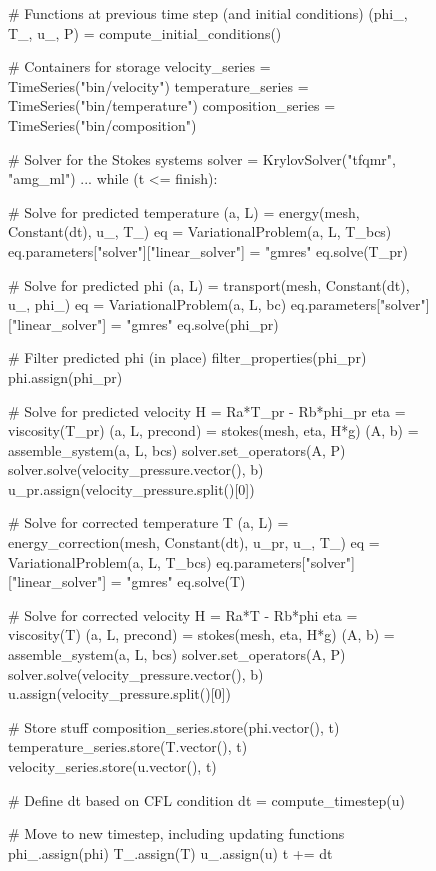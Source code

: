 \begin{figure}
  \begin{center}
    \begin{python}
# Functions at previous time step (and initial conditions)
(phi_, T_, u_, P) = compute_initial_conditions()

# Containers for storage
velocity_series = TimeSeries("bin/velocity")
temperature_series = TimeSeries("bin/temperature")
composition_series = TimeSeries("bin/composition")

# Solver for the Stokes systems
solver = KrylovSolver("tfqmr", "amg_ml")
...
while (t <= finish):

    # Solve for predicted temperature
    (a, L) = energy(mesh, Constant(dt), u_, T_)
    eq = VariationalProblem(a, L, T_bcs)
    eq.parameters["solver"]["linear_solver"] = "gmres"
    eq.solve(T_pr)

    # Solve for predicted phi
    (a, L) = transport(mesh, Constant(dt), u_, phi_)
    eq = VariationalProblem(a, L, bc)
    eq.parameters["solver"]["linear_solver"] = "gmres"
    eq.solve(phi_pr)

    # Filter predicted phi (in place)
    filter_properties(phi_pr)
    phi.assign(phi_pr)

    # Solve for predicted velocity
    H = Ra*T_pr - Rb*phi_pr
    eta = viscosity(T_pr)
    (a, L, precond) = stokes(mesh, eta, H*g)
    (A, b) = assemble_system(a, L, bcs)
    solver.set_operators(A, P)
    solver.solve(velocity_pressure.vector(), b)
    u_pr.assign(velocity_pressure.split()[0])

    # Solve for corrected temperature T
    (a, L) = energy_correction(mesh, Constant(dt), u_pr, u_, T_)
    eq = VariationalProblem(a, L, T_bcs)
    eq.parameters["solver"]["linear_solver"] = "gmres"
    eq.solve(T)

    # Solve for corrected velocity
    H = Ra*T - Rb*phi
    eta = viscosity(T)
    (a, L, precond) = stokes(mesh, eta, H*g)
    (A, b) = assemble_system(a, L, bcs)
    solver.set_operators(A, P)
    solver.solve(velocity_pressure.vector(), b)
    u.assign(velocity_pressure.split()[0])

    # Store stuff
    composition_series.store(phi.vector(), t)
    temperature_series.store(T.vector(), t)
    velocity_series.store(u.vector(), t)

    # Define dt based on CFL condition
    dt = compute_timestep(u)

    # Move to new timestep, including updating functions
    phi_.assign(phi)
    T_.assign(T)
    u_.assign(u)
    t += dt
    \end{python}


\end{center}
\end{figure}
